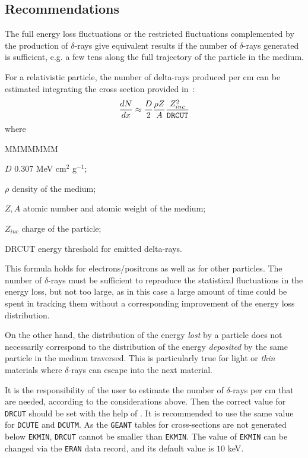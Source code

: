 \subsection{Recommendations}
The full energy loss fluctuations or the restricted fluctuations
complemented by the production of $\delta$-rays give equivalent
results if the number of $\delta$-rays generated 
is sufficient, e.g. a few tens along
the full trajectory of the particle in the medium.
 
For a relativistic particle, the number of delta-rays
produced per cm can be estimated integrating the
cross section provided in~\cite{bib-PDGB}:
\begin{equation}
\frac{dN}{dx} \approx \frac{D}{2} \frac{\rho Z}{A} 
\frac{Z_{inc}^2}{\mbox{\tt DRCUT}}
\end{equation}
where
\begin{DLtt}{MMMMMMM}
\item[$D$] 0.307 MeV cm$^2$ g$^{-1}$;
\item[$\rho$] density of the medium;
\item[$Z,A$] atomic number and atomic weight of the medium;
\item[$Z_{inc}$] charge of the particle;
\item[DRCUT] energy threshold for emitted delta-rays.
\end{DLtt}
This formula holds for electrons/positrons as well as for other particles.
The number of $\delta$-rays must be sufficient 
to reproduce the statistical fluctuations in the energy loss,
but not too large, as in this case
a large amount of time could be spent in 
tracking them
without a corresponding improvement of the energy loss distribution.

On the other hand, the distribution of the
energy {\it lost} by a particle does not necessarily correspond to the
distribution of the energy {\it deposited} by the same particle in the
medium traversed. This is particularly true for light or {\it thin}
materials where $\delta$-rays can escape into the
next material.

It is the responsibility of the user to estimate the number of $\delta$-rays 
per cm that are needed, according to the considerations above. Then the 
correct value for {\tt DRCUT} should be set with the help of . 
It is recommended to use the same value for {\tt DCUTE} and {\tt DCUTM}.
As the {\tt GEANT} tables for cross-sections are not generated below 
{\tt EKMIN}, {\tt DRCUT} cannot be smaller than {\tt EKMIN}. The value of 
{\tt EKMIN} can be changed via the {\tt ERAN} data record, and its default
value is $10$ keV.

